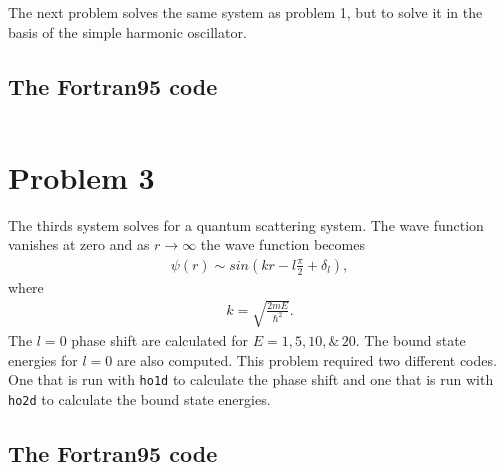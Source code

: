 \documentclass[12pt]{article}
\begin{document}
The next problem solves the same system as problem 1, but to solve it in the basis of the simple harmonic oscillator.

\subsection{The Fortran95 code}

\begin{lstlisting}[frame=single,caption={ {\tt int.f95}},label=module]

\end{lstlisting}

\section{Problem 3}
The thirds system solves for a quantum scattering system. The wave function vanishes at zero and as $r\rightarrow \infty$ the wave function becomes
\begin{gather}
\psi(r) \sim sin(kr - l\frac{\pi}{2} + \delta_l),
\end{gather}
where
\begin{gather}
k=\sqrt{\frac{2mE}{\hbar^2}}.
\end{gather}
The $l=0$ phase shift are calculated for $E=1,5,10, \& \, 20$. The bound state energies for $l=0$ are also computed. This problem required two different codes. One that is run with {\tt ho1d} to calculate the phase shift and one that is run with {\tt ho2d} to calculate the bound state energies.

\subsection{The Fortran95 code}
\end{document}
